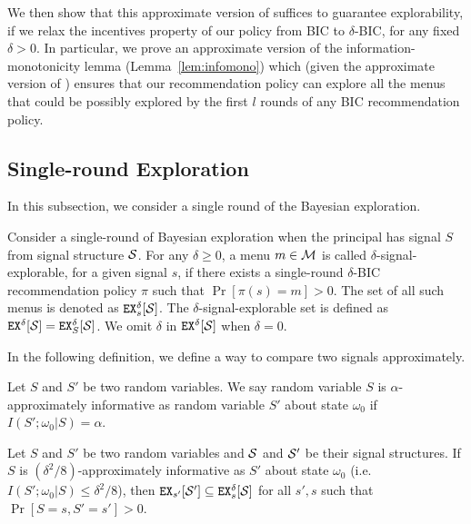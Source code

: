We then show that this approximate version of   suffices to guarantee explorability, if we relax the incentives property of our policy from BIC to $\delta$-BIC, for any fixed $\delta>0$. In particular, we prove an approximate version of the information-monotonicity lemma (Lemma~\ref{lem:infomono}) which (given the approximate version of ) ensures that our recommendation policy can explore all the menus that could be possibly explored by the first $l$ rounds of any BIC recommendation policy.


\subsection{Single-round Exploration}
\label{sec:private_single}

In this subsection, we consider a single round of the Bayesian exploration.

\begin{definition}
Consider a single-round of Bayesian exploration when the principal has signal $S$ from signal structure $\S$. For any $\delta \geq 0$, a menu $m \in \M$ is called $\delta$-signal-explorable, for a given signal $s$, if there exists a single-round $\delta$-BIC recommendation policy $\pi$ such that $\Pr[\pi(s) = m] > 0$. The set of all such menus is denoted as $\EX^{\delta}_s[\S]$. The $\delta$-signal-explorable set is defined as $\EX^{\delta}[\S] = \EX^{\delta}_S[\S]$. We omit $\delta$ in $\EX^{\delta}[\S]$ when $\delta = 0$.
\end{definition}

In the following definition, we define a way to compare two signals approximately.
\begin{definition}
Let $S$ and $S'$ be two random variables. We say random variable $S$ is $\alpha$-approximately informative as random variable $S'$ about state $\omega_0$ if $I(S' ; \omega_0|S) = \alpha$.
\end{definition}

\begin{lemma}
\label{lem:ainfomono}
Let $S$ and $S'$ be two random variables and $\S$ and $\S'$ be their signal structures. If $S$ is $(\delta^2/8)$-approximately informative as $S'$ about state $\omega_0$ (i.e. $I(S' ; \omega_0|S) \leq \delta^2/8$), then $\EX_{s'}[\S'] \subseteq \EX^{\delta}_s[\S]$  for all $s' ,s$ such that $\Pr[S= s, S'= s'] > 0$.
\end{lemma}

